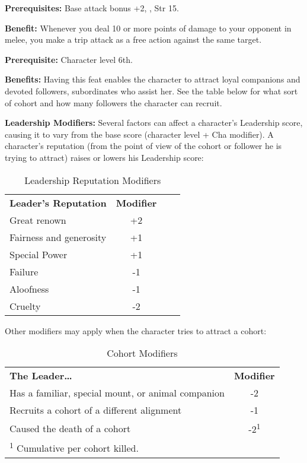 
\textbf{Prerequisites:} Base attack bonus +2, , Str 15.

\textbf{Benefit:} Whenever you deal 10 or more points of damage to your opponent 
in melee, you make a trip attack as a free action against the same target.


\textbf{Prerequisite:} Character level 6th.

\textbf{Benefits:} Having this feat enables the character to attract loyal companions 
and devoted followers, subordinates who assist her. See the table below for what 
sort of cohort and how many followers the character can recruit.

\textbf{Leadership Modifiers:} Several factors can affect a character's Leadership 
score, causing it to vary from the base score (character level + Cha modifier). 
A character's reputation (from the point of view of the cohort or follower he is 
trying to attract) raises or lowers his Leadership score:

\begin{table}[htb]
\caption{Leadership Reputation Modifiers}
\centering
\begin{tabular}{l c c c}
\textbf{Leader's Reputation} & \textbf{Modifier}\\
Great renown & +2\\
Fairness and generosity & +1\\
Special Power & +1\\
Failure & -1 \\
Aloofness & -1\\
Cruelty & -2\\
\end{tabular}
\end{table}

Other modifiers may apply when the character tries to attract a cohort:

\begin{table}[htb]
\caption{Cohort Modifiers}
\centering
\begin{tabular}{l c}
\textbf{The Leader\ldots{}} & \textbf{Modifier}\\
Has a familiar, special mount, or animal companion & -2\\
Recruits a cohort of a different alignment & -1\\
Caused the death of a cohort & -2\textsuperscript{1}\\
\multicolumn{2}{l}{\textsuperscript{1} Cumulative per cohort killed.}\\
\end{tabular}
\end{table}

